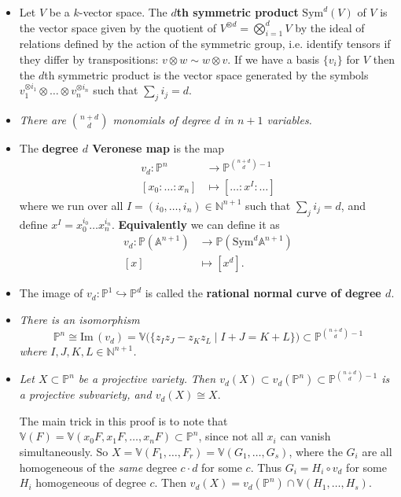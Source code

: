 \documentclass[10pt]{article}
\newcommand{\nn}{\mathbb{N}}
\renewcommand{\Im}{\mathrm{Im}\,}
\newcommand{\van}{\mathbb{V}}
\newcommand{\aff}{\mathbb{A}}
\newcommand{\pee}{\mathbb{P}}
\begin{document}
            \begin{itemize}
                \item Let $V$ be a $k$-vector space.
                    The \textbf{$d$th symmetric product} $\mathrm{Sym}^d(V)$ of $V$ is the vector space given by the quotient of $V^{\otimes d}=\bigotimes_{i=1}^d V$ by the ideal of relations defined by the action of the symmetric group, i.e. identify tensors if they differ by transpositions: $v\otimes w\sim w\otimes v$.
                    If we have a basis $\{v_i\}$ for $V$ then the $d$th symmetric product is the vector space generated by the symbols $v_1^{\otimes i_1}\otimes\ldots\otimes v_n^{\otimes i_n}$ such that $\sum_j i_j=d$.
                \item \emph{There are $\binom{n+d}{d}$ monomials of degree $d$ in $n+1$ variables.}
                \item The \textbf{degree $d$ Veronese map} is the map
                    \begin{align*}
                        v_d\colon\pee^n&\to\pee^{\binom{n+d}{d}-1}\\
                        [x_0:\ldots:x_n]&\mapsto[\ldots:x^I:\ldots]
                    \end{align*}
                    where we run over all $I=(i_0,\ldots,i_n)\in\nn^{n+1}$ such that $\sum_j i_j=d$, and define $x^I=x_0^{i_0}\ldots x_n^{i_n}$.
                    \textbf{Equivalently} we can define it as
                    \begin{align*}
                        v_d\colon\pee(\aff^{n+1})&\to\pee(\mathrm{Sym}^d\aff^{n+1})\\
                        [x]&\mapsto[x^d].
                    \end{align*}
                \item The image of $v_d\colon\pee^1\hookrightarrow\pee^d$ is called the \textbf{rational normal curve of degree $d$}.
                \item \emph{There is an isomorphism}
                    \begin{equation*}
                        \pee^n\cong \Im(v_d)=\van\big(\{z_Iz_J-z_Kz_L\mid I+J=K+L\}\big)\subset\pee^{\binom{n+d}{d}-1}
                    \end{equation*}
                    \emph{where $I,J,K,L\in\nn^{n+1}$.}
                \item \emph{Let $X\subset\pee^n$ be a projective variety.}
                    \emph{Then $v_d(X)\subset v_d(\pee^n)\subset\pee^{\binom{n+d}{d}-1}$ is a projective subvariety, and $v_d(X)\cong X$}.

                    The main trick in this proof is to note that $\van(F)=\van(x_0F,x_1F,\ldots,x_nF)\subset\pee^n$, since not all $x_i$ can vanish simultaneously.
                    So $X=\van(F_1,\ldots,F_r)=\van(G_1,\ldots,G_s)$, where the $G_i$ are all homogeneous of the \emph{same} degree $c\cdot d$ for some $c$.
                    Thus $G_i=H_i\circ v_d$ for some $H_i$ homogeneous of degree $c$.
                    Then $v_d(X)=v_d(\pee^n)\cap\van(H_1,\ldots,H_s)$.
            \end{itemize}
\end{document}
